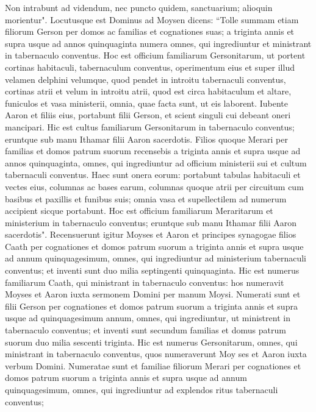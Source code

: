 \begin{biblechapter}
\verse Non intrabunt ad videndum, nec puncto quidem, sanctuarium; alioquin morientur". 
\verse Locutusque est Dominus ad Moysen dicens: 
\verse “Tolle summam etiam filiorum Gerson per domos ac familias et cognationes suas; 
\verse a triginta annis et supra usque ad annos quinquaginta numera omnes, qui ingrediuntur et ministrant in tabernaculo conventus. 
\verse Hoc est officium familiarum Gersonitarum, 
\verse ut portent cortinas habitaculi, tabernaculum conventus, operimentum eius et super illud velamen delphini velumque, quod pendet in introitu tabernaculi conventus, 
\verse cortinas atrii et velum in introitu atrii, quod est circa habitaculum et altare, funiculos et vasa ministerii, omnia, quae facta sunt, ut eis laborent. 
\verse Iubente Aaron et filiis eius, portabunt filii Gerson, et scient singuli cui debeant oneri mancipari. 
\verse Hic est cultus familiarum Gersonitarum in tabernaculo conventus; eruntque sub manu Ithamar filii Aaron sacerdotis. 
\verse Filios quoque Merari per familias et domos patrum suorum recensebis 
\verse a triginta annis et supra usque ad annos quinquaginta, omnes, qui ingrediuntur ad officium ministerii sui et cultum tabernaculi conventus. 
\verse Haec sunt onera eorum: portabunt tabulas habitaculi et vectes eius, columnas ac bases earum, 
\verse columnas quoque atrii per circuitum cum basibus et paxillis et funibus suis; omnia vasa et supellectilem ad numerum accipient sicque portabunt. 
\verse Hoc est officium familiarum Meraritarum et ministerium in tabernaculo conventus; eruntque sub manu Ithamar filii Aaron sacerdotis". 
\verse Recensuerunt igitur Moyses et Aaron et principes synagogae filios Caath per cognationes et domos patrum suorum 
\verse a triginta annis et supra usque ad annum quinquagesimum, omnes, qui ingrediuntur ad ministerium tabernaculi conventus; 
\verse et inventi sunt duo milia septingenti quinquaginta. 
\verse Hic est numerus familiarum Caath, qui ministrant in tabernaculo conventus: hos numeravit Moyses et Aaron iuxta sermonem Domini per manum Moysi. 
\verse Numerati sunt et filii Gerson per cognationes et domos patrum suorum 
\verse a triginta annis et supra usque ad quinquagesimum annum, omnes, qui ingrediuntur, ut ministrent in tabernaculo conventus; 
\verse et inventi sunt secundum familias et domus patrum suorum duo milia sescenti triginta. 
\verse Hic est numerus Gersonitarum, omnes, qui ministrant in tabernaculo conventus, quos numeraverunt Moy ses et Aaron iuxta verbum Domini. 
\verse Numeratae sunt et familiae filiorum Merari per cognationes et domos patrum suorum 
\verse a triginta annis et supra usque ad annum quinquagesimum, omnes, qui ingrediuntur ad explendos ritus tabernaculi conventus; 

\end{biblechapter}
